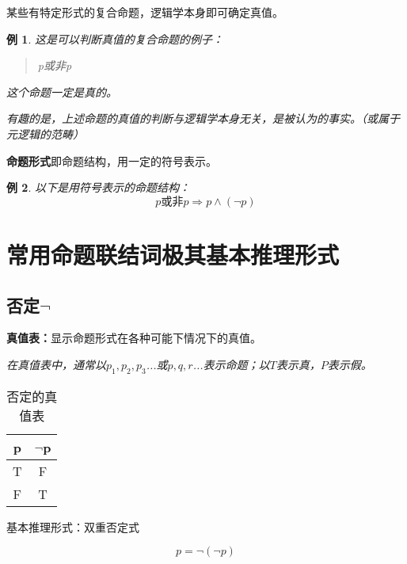 \documentclass[12pt,onecolumn,a4paper]{book}
\newtheorem*{example}{例}
\numberwithin{table}{subsection}
\numberwithin{equation}{subsection}
\begin{document}
某些有特定形式的复合命题，逻辑学本身即可确定真值。

\begin{example}
    这是可以判断真值的复合命题的例子：

    \begin{quotation}
    p或非p
    \end{quotation}

    这个命题一定是真的。
\end{example}

\emph{有趣的是，上述命题的真值的判断与逻辑学本身无关，是被认为的事实。（或属于元逻辑的范畴）}

\textbf{命题形式}即命题结构，用一定的符号表示。

\begin{example}
    以下是用符号表示的命题结构：
    \begin{equation}
    p\mbox{或非}p \Rightarrow p \wedge (\neg p)
    \end{equation}
\end{example}

\section{常用命题联结词极其基本推理形式}\label{2.3}


\subsection{否定$\neg$}

\textbf{真值表：}显示命题形式在各种可能下情况下的真值。

\emph{在真值表中，通常以$p_{1},p_{2},p_{3}$...或$p,q,r$...表示命题；以$T$表示真，$P$表示假。}

\begin{table}[h]
    \centering
    \setlength{\tabcolsep}{5mm}
    \begin{tabular}{cc}
        \toprule
        p & $\neg$p \\ 
        \midrule
        T & F\\
        F & T\\
        \bottomrule
    \end{tabular}
    \caption{否定的真值表}
\end{table}

基本推理形式：双重否定式

\begin{equation}
     p = \neg(\neg p)
\end{equation}
\end{document}
